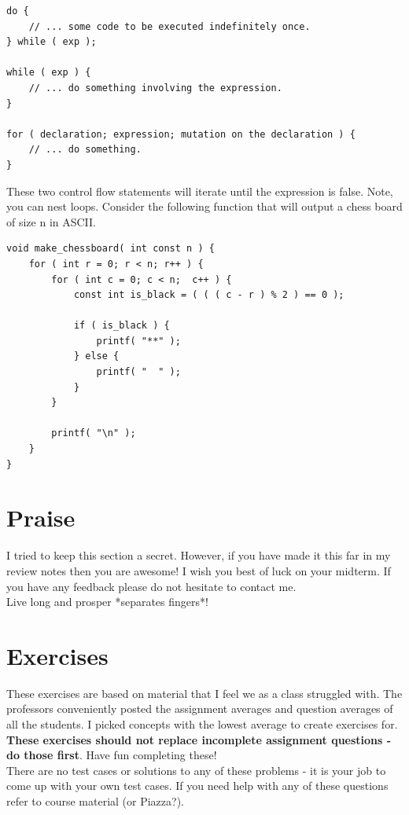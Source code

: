 \documentclass[12pt,extarticle]{article}
\begin{document}
\lstset {
	language=c
}
\begin{lstlisting}
do {
	// ... some code to be executed indefinitely once.
} while ( exp );

while ( exp ) {
	// ... do something involving the expression.
}

for ( declaration; expression; mutation on the declaration ) {
	// ... do something.
}
\end{lstlisting}

These two control flow statements will iterate until the expression is false. Note, you can nest loops. Consider the following function that will output a chess board of size n in ASCII.\\

\lstset {
	language=c
}
\begin{lstlisting}
void make_chessboard( int const n ) {
	for ( int r = 0; r < n; r++ ) {
		for ( int c = 0; c < n;  c++ ) {
			const int is_black = ( ( ( c - r ) % 2 ) == 0 );
			
			if ( is_black ) {
				printf( "**" );
			} else {
				printf( "  " );
			}
		}
		
		printf( "\n" );
	}
}
\end{lstlisting}

\newpage
\section{Praise}

I tried to keep this section a secret. However, if you have made it this far in my review notes then you are awesome! I wish you best of luck on your midterm. If you have any feedback please do not hesitate to contact me.\\

Live long and prosper *separates fingers*!

\newpage
\section{Exercises}

These exercises are based on material that I feel we as a class struggled with. The professors conveniently posted the assignment averages and question averages of all the students. I picked concepts with the lowest average to create exercises for. \textbf{These exercises should not replace incomplete assignment questions - do those first}. Have fun completing these!\\

There are no test cases or solutions to any of these problems - it is your job to come up with your own test cases. If you need help with any of these questions refer to course material (or Piazza?).
\end{document}

